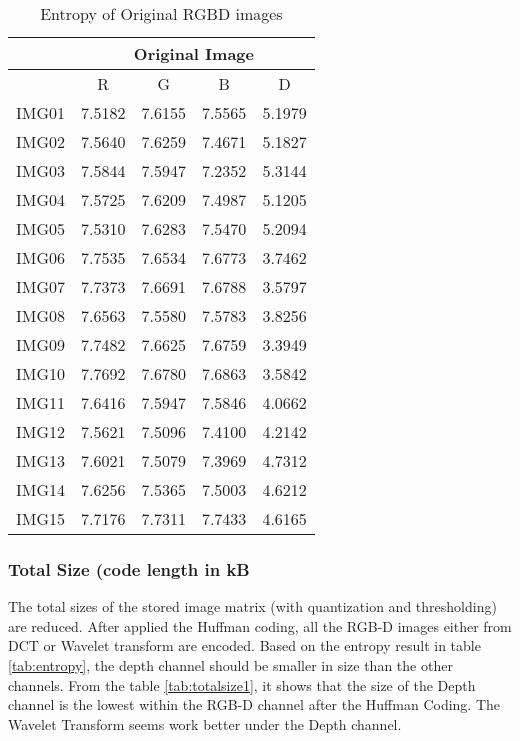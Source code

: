 \begin{table}
\center
\begin{tabular}{|l|r|r|r|r|}\hline
& \multicolumn{4}{|c|}{Original Image} \\\hline 
& \multicolumn{1}{|c|}{R} & \multicolumn{1}{|c|}{G} & \multicolumn{1}{|c|}{B} & \multicolumn{1}{|c|}{D} \\\hline 
IMG01 & 7.5182 & 7.6155 & 7.5565 & 5.1979 \\\hline 
IMG02 & 7.5640 & 7.6259 & 7.4671 & 5.1827  \\\hline 
IMG03 & 7.5844 & 7.5947 & 7.2352 & 5.3144  \\\hline
IMG04 & 7.5725 & 7.6209 & 7.4987 & 5.1205  \\\hline
IMG05 & 7.5310 & 7.6283 & 7.5470 & 5.2094  \\\hline
IMG06 & 7.7535 & 7.6534 & 7.6773 & 3.7462  \\\hline
IMG07 & 7.7373 & 7.6691 & 7.6788 & 3.5797  \\\hline
IMG08 & 7.6563 & 7.5580 & 7.5783 & 3.8256  \\\hline
IMG09 & 7.7482 & 7.6625 & 7.6759 & 3.3949  \\\hline
IMG10 & 7.7692 & 7.6780 & 7.6863 & 3.5842  \\\hline
IMG11 & 7.6416 & 7.5947 & 7.5846 & 4.0662  \\\hline
IMG12 & 7.5621 & 7.5096 & 7.4100 & 4.2142  \\\hline
IMG13 & 7.6021 & 7.5079 & 7.3969 & 4.7312  \\\hline
IMG14 & 7.6256 & 7.5365 & 7.5003 & 4.6212  \\\hline
IMG15 & 7.7176 & 7.7311 & 7.7433 & 4.6165 \\\hline
\end{tabular}
\caption{Entropy of Original RGBD images}
\label{tab:orgimage1}
\end{table}


\subsubsection{Total Size (code length in kB}
The total sizes of the stored image matrix (with quantization and thresholding) are reduced. 
After applied the Huffman coding, all the RGB-D images either from DCT or Wavelet transform are encoded. Based on the entropy result in table \ref{tab:entropy}, the depth channel should be smaller in size than the other channels. 
From the table \ref{tab:totalsize1}, it shows that the size of the Depth channel is the lowest within the RGB-D channel after the Huffman Coding. The Wavelet Transform seems work better under the Depth channel.

